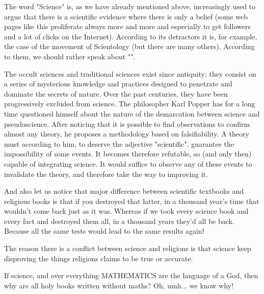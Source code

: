 	The word "Science" is, as we have already mentioned above, increasingly used to argue that there is a scientific evidence where there is only a belief (some web pages like this proliferate always more and more and especially to get followers and a lot of clicks on the Internet). According to its detractors it is, for example, the case of the movement of Scientology (but there are many others). According to them, we should rather speak about "".

	The occult sciences and traditional sciences exist since antiquity; they consist on a series of mysterious knowledge and practices designed to penetrate and dominate the secrets of nature. Over the past centuries, they have been progressively excluded from science. The philosopher Karl Popper has for a long time questioned himself about the nature of the demarcation between science and pseudoscience. After noticing that it is possible to find observations to confirm almost any theory, he proposes a methodology based on falsifiability. A theory must according to him, to deserve the adjective "scientific", guarantee the impossibility of some events. It becomes therefore refutable, so (and only then) capable of integrating science. It would suffice to observe any of these events to invalidate the theory, and therefore take the way to improving it.
	
	And also let us notice that major difference between scientific textbooks and religious books is that if you destroyed that latter, in a thousand year's time that wouldn't come back just as it was. Whereas if we took every science book and every fact and destroyed them all, in a thousand years they'd all be back. Because all the same tests would lead to the same results again!
	\begin{fquote}The reason there is a conflict between science and religions is that science keep disproving the things religions claims to be true or accurate.
 	\end{fquote}
	\begin{tcolorbox}[title=Remark,arc=10pt,breakable,drop lifted shadow,
  skin=enhanced,
  skin first is subskin of={enhancedfirst}{arc=10pt,no shadow},
  skin middle is subskin of={enhancedmiddle}{arc=10pt,no shadow},
  skin last is subskin of={enhancedlast}{drop lifted shadow}]
	If science, and over everything MATHEMATICS are the language of a God, then why are all holy books written without maths? Oh, umh... we know why!
	\end{tcolorbox}
	
